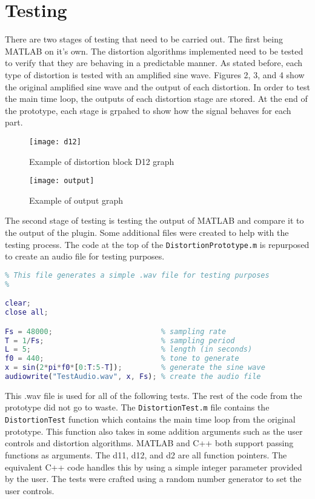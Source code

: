 \documentclass{article}
\begin{document}
\section{Testing}
There are two stages of testing that need to be carried out. The first being MATLAB
on it's own. The distortion algorithms implemented need to be tested to verify that
they are behaving in a predictable manner. As stated before, each type of distortion is
tested with an amplified sine wave. Figures 2, 3, and 4 show the original amplified
sine wave and the output of each distortion. In order to test the main time loop, the
outputs of each distortion stage are stored. At the end of the prototype, each stage is
grpahed to show how the signal behaves for each part.
\begin{figure}[ht]
\centerline{\texttt{[image: d12]}}
\caption{Example of distortion block D12 graph}
\end{figure}
\begin{figure}[ht]
\centerline{\texttt{[image: output]}}
\caption{Example of output graph}
\end{figure}

The second stage of testing is testing the output of MATLAB and compare it to the
output of the plugin. Some additional files were created to help with the testing
process. The code at the top of the \lstinline{DistortionPrototype.m} is repurposed
to create an audio file for testing purposes.

\begin{lstlisting}[language=MATLAB]
%
% This file generates a simple .wav file for testing purposes
%

clear;
close all;

Fs = 48000;                         % sampling rate
T = 1/Fs;                           % sampling period
L = 5;                              % length (in seconds)
f0 = 440;                           % tone to generate
x = sin(2*pi*f0*[0:T:5-T]);         % generate the sine wave
audiowrite("TestAudio.wav", x, Fs); % create the audio file

\end{lstlisting}

This .wav file is used for all of the following tests. The rest of the code from the prototype did not go
to waste. The \lstinline{DistortionTest.m} file contains the \lstinline{DistortionTest} function
which contains the main time loop from the original prototype. This function also takes in some addition arguments
such as the user controls and distortion algorithms. MATLAB and C++ both support passing functions
as arguments. The d11, d12, and d2 are all function pointers. The equivalent C++ code handles this by
using a simple integer parameter provided by the user. The tests were crafted using a random number generator to set the user controls.
\end{document}
